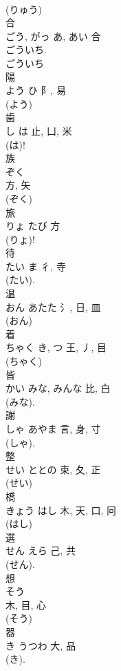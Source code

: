 \documentclass[8pt]{extreport}
\begin{document}
\begin{CJK}{UTF8}{min}
\\	(りゅう) 
\\	合	
\\	ごう, がっ	あ, あい	合	
\\	ごういち.	
\\	ごういち 
\\	陽	
\\	よう	ひ	阝, 易	
\\	(よう) 
\\	歯	
\\	し	は	止, 凵, 米	
\\	(は)! 
\\	族	
\\	ぞく	
\\	方, 矢		
\\	(ぞく) 
\\	旅	
\\	りょ	たび	方	
\\	(りょ)! 
\\	待	
\\	たい	ま	彳, 寺	
\\	(たい). 
\\	温	
\\	おん	あたた	氵, 日, 皿	
\\	(おん) 
\\	着	
\\	ちゃく	き, つ	王, 丿, 目		
\\	(ちゃく) 
\\	皆	
\\	かい	みな, みんな	比, 白	
\\	(みな). 
\\	謝	
\\	しゃ	あやま	言, 身, 寸	
\\	(しゃ). 
\\	整	
\\	せい	ととの	束, 夂, 正	
\\	(せい) 
\\	橋	
\\	きょう	はし	木, 天, 口, 冋	
\\	(はし) 
\\	選	
\\	せん	えら	己, 共		
\\	(せん). 
\\	想	
\\	そう	
\\	木, 目, 心	
\\	(そう) 
\\	器	
\\	き	うつわ	大, 品	
\\	(き). 

\end{CJK}
\end{document}

